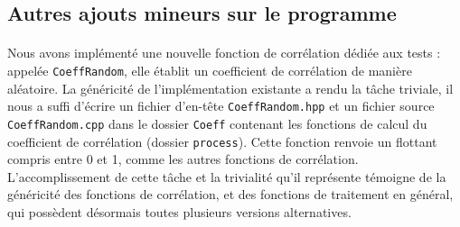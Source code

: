  \subsection{Autres ajouts mineurs sur le programme}
 \paragraph{}
 Nous avons implémenté une nouvelle fonction de corrélation dédiée aux
 tests : appelée \verb!CoeffRandom!, elle établit un coefficient de
 corrélation de manière aléatoire. La généricité de l'implémentation
 existante a rendu la tâche triviale, il nous a suffi d'écrire un
 fichier d'en-tête \verb!CoeffRandom.hpp! et un fichier source
 \verb!CoeffRandom.cpp! dans le dossier \verb!Coeff! contenant les
 fonctions de calcul du coefficient de corrélation (dossier
 \verb!process!). Cette fonction renvoie un flottant compris entre 0 et
 1, comme les autres fonctions de corrélation. L'accomplissement de
 cette tâche et la trivialité qu'il représente témoigne de la
 généricité des fonctions de corrélation, et des fonctions de
 traitement en général, qui possèdent désormais toutes plusieurs
 versions alternatives.
